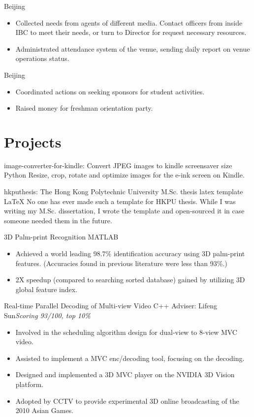 \documentclass[10pt,a4paper]{moderncv/moderncv}
\begin{document}
{Beijing}{}
{
\begin{itemize}
	\item Collected needs from agents of different media. Contact officers from inside IBC to meet their needs, or turn to Director for request necessary resources.
	\item Administrated attendance system of the venue, sending daily report on venue operations status.
\end{itemize}
}

{Beijing}{}
{
\begin{itemize}
	\item Coordinated actions on seeking sponsors for student activities.
	\item Raised money for freshman orientation party.
\end{itemize}
}

\section{Projects}

{image-converter-for-kindle: Convert JPEG images to kindle screensaver size}
{Python}
{}{}
{
Resize, crop, rotate and optimize images for the e-ink screen on Kindle.
}

% 
{hkputhesis: The Hong Kong Polytechnic University M.Sc. thesis latex template}
{LaTeX}
{}{}
{
No one has ever made such a template for HKPU thesis. While I was writing my M.Sc. dissertation, I wrote the template and open-sourced it in case someone needed them in the future.
}

{3D Palm-print Recognition}
{MATLAB}
{}{}
{
\begin{itemize}
	\item Achieved a world leading 98.7\% identification accuracy using 3D palm-print features. (Accuracies found in previous literature were less than 93\%.)
	\item 2X speedup (compared to searching sorted database) gained by utilizing 3D global feature index.
\end{itemize}
}

{Real-time Parallel Decoding of Multi-view Video}
{C++}
{Adviser: Lifeng Sun}{\textit{Scoring 93/100, top 10\%}}
{
\begin{itemize}
	\item Involved in the scheduling algorithm design for dual-view to 8-view MVC video.
	\item Assisted to implement a MVC enc/decoding tool, focusing on the decoding.
	\item Designed and implemented a 3D MVC player on the NVIDIA 3D Vision platform.
	\item Adopted by CCTV to provide experimental 3D online broadcasting of the 2010 Asian Games.
\end{itemize}
}
\end{document}
